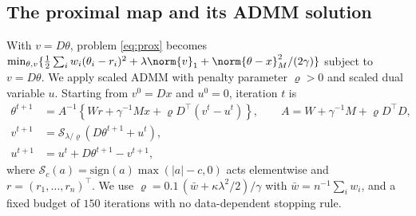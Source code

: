 \subsection{The proximal map and its ADMM solution}
\label{app:pmala:admm}

With $v = D\theta$, problem \eqref{eq:prox} becomes $\min_{\theta, v}\{\frac12\sum_i w_i(\theta_i - r_i)^2 + \lambda\norm{v}_1 + \norm{\theta - x}_M^2/(2\gamma)\}$ subject to $v = D\theta$. We apply scaled ADMM with penalty parameter $\varrho > 0$ and scaled dual variable $u$. Starting from $v^0 = Dx$ and $u^0 = 0$, iteration $t$ is
\begin{align*}
\theta^{t+1} &= A^{-1}\left\{ W r + \gamma^{-1} M x + \varrho D^\top (v^t - u^t) \right\}, \qquad A = W + \gamma^{-1} M + \varrho D^\top D, \\
v^{t+1} &= \mathcal{S}_{\lambda/\varrho}\!\left(D\theta^{t+1} + u^t\right), \\
u^{t+1} &= u^t + D\theta^{t+1} - v^{t+1},
\end{align*}
where $\mathcal{S}_c(a) = \mathrm{sign}(a)\max(|a| - c, 0)$ acts elementwise and $r = (r_1,\ldots,r_n)^\top$. We use $\varrho = 0.1\,(\bar w + \kappa\lambda^2/2)/\gamma$ with $\bar w = n^{-1}\sum_i w_i$, and a fixed budget of $150$ iterations with no data-dependent stopping rule.

